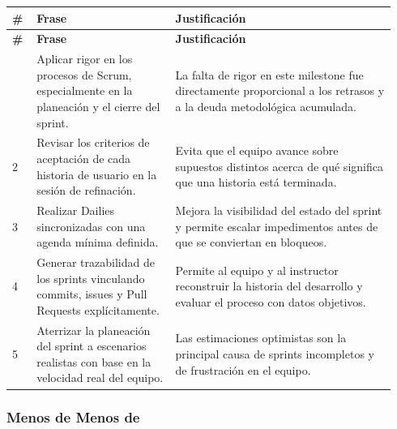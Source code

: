 \documentclass[11pt,a4paper]{article}
\begin{document}
\begingroup
\scriptsize
\setlength{\tabcolsep}{3pt}
\begin{longtable}{P{0.06\linewidth}P{0.34\linewidth}P{0.54\linewidth}}
\toprule
\textbf{\#} & \textbf{Frase} & \textbf{Justificación} \\
\midrule
\endfirsthead
\toprule
\textbf{\#} & \textbf{Frase} & \textbf{Justificación} \\
\midrule
\endhead
\bottomrule
{} & Aplicar rigor en los procesos de Scrum, especialmente en la planeación y el cierre del sprint. & La falta de rigor en este milestone fue directamente proporcional a los retrasos y a la deuda metodológica acumulada. \\
2 & Revisar los criterios de aceptación de cada historia de usuario en la sesión de refinación. & Evita que el equipo avance sobre supuestos distintos acerca de qué significa que una historia está terminada. \\
3 & Realizar Dailies sincronizadas con una agenda mínima definida. & Mejora la visibilidad del estado del sprint y permite escalar impedimentos antes de que se conviertan en bloqueos. \\
4 & Generar trazabilidad de los sprints vinculando commits, issues y Pull Requests explícitamente. & Permite al equipo y al instructor reconstruir la historia del desarrollo y evaluar el proceso con datos objetivos. \\
5 & Aterrizar la planeación del sprint a escenarios realistas con base en la velocidad real del equipo. & Las estimaciones optimistas son la principal causa de sprints incompletos y de frustración en el equipo. \\
\end{longtable}
\endgroup

\subsubsection{Menos de Menos de}
\end{document}
